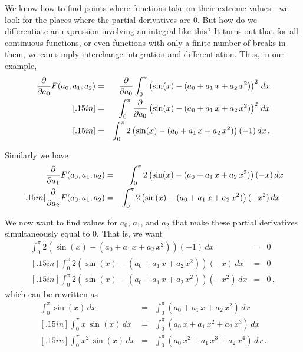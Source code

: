 {{{{We know how to find points where functions take on their extreme values---we look for the places where the partial derivatives are 0. But how do we differentiate an expression involving an integral like this?  It turns out that for all continuous functions, or even functions with only a finite number of breaks in them, we can simply interchange integration and differentiation.  Thus, in our example,
\begin{eqnarray*}
{\partial \over \partial a_0}F(a_0, a_1, a_2)&=&{\partial \over \partial a_0}\int_0^{\pi} \left( \sin(x) - (a_0 + a_1\,x + a_2\,x^2)\right)^2 \, dx \\ [.15in]
&=&\int_0^{\pi} {\partial \over \partial a_0}\left( \sin(x) - (a_0 + a_1\,x + a_2\,x^2)\right)^2 \, dx \\ [.15in]
&=&\int_0^{\pi}2\left( \sin(x) - (a_0 + a_1\,x + a_2\,x^2)\right)(-1) \, dx \, .
\end{eqnarray*}

Similarly we have
\begin{eqnarray*}
{\partial \over \partial a_1}F(a_0, a_1, a_2)&=&\int_0^{\pi}2\left( \sin(x) - (a_0 + a_1\,x + a_2\,x^2)\right)(-x) \, dx \\ [.15in]
{\partial \over \partial a_2}F(a_0, a_1, a_2)&=&\int_0^{\pi}2\left( \sin(x) - (a_0 + a_1\,x + a_2\,x^2)\right)(-x^2) \, dx \, .
\end{eqnarray*}

We now want 
to find values for $a_0$, $a_1$, and $a_2$ that make these partial derivatives simultaneously equal to 0.  That is, we want
\begin{eqnarray*}
\int_0^{\pi}2\left( \sin(x) - (a_0 + a_1\,x + a_2\,x^2)\right)(-1) \, dx &=&0 \\ [.15in]
\int_0^{\pi}2\left( \sin(x) - (a_0 + a_1\,x + a_2\,x^2)\right)(-x) \, dx &=&0 \\ [.15in]
\int_0^{\pi}2\left( \sin(x) - (a_0 + a_1\,x + a_2\,x^2)\right)(-x^2) \, dx &=&0 \, ,
\end{eqnarray*}
which can be rewritten as
\begin{eqnarray*}
\int_0^{\pi}\sin(x) \, dx&=&\int_0^{\pi}\left( a_0 + a_1\,x + a_2\,x^2\right)\, dx  \\ [.15in]
\int_0^{\pi}x\,\sin(x) \, dx&=&\int_0^{\pi}\left(a_0\,x + a_1\,x^2 + a_2\,x^3\right) \, dx  \\ [.15in]
\int_0^{\pi}x^2\,\sin(x) \, dx&=&\int_0^{\pi}\left( a_0\,x^2 + a_1\,x^3 + a_2\,x^4\right) \, dx  \, .
\end{eqnarray*}

}}}}
